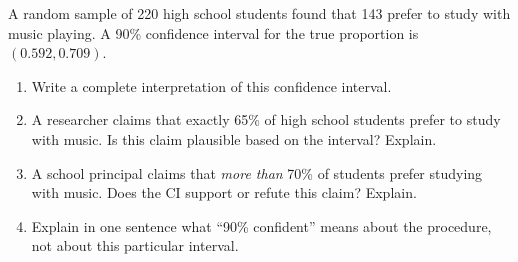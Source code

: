 \documentclass[10pt]{article}
\begin{document}
\namedateperiod

\vspace{0.15in}

A random sample of 220 high school students found that 143 prefer to study with music
playing. A 90\% confidence interval for the true proportion is $(0.592, 0.709)$.

\begin{enumerate}
  \item Write a complete interpretation of this confidence interval.

  \item A researcher claims that exactly 65\% of high school students prefer to study with
        music. Is this claim plausible based on the interval? Explain.

  \item A school principal claims that \emph{more than} 70\% of students prefer studying
        with music. Does the CI support or refute this claim? Explain.

  \item Explain in one sentence what ``90\% confident'' means about the procedure, not about
        this particular interval.
\end{enumerate}
\end{document}
